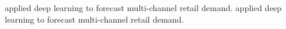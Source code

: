 \cite{punia_deep_2020} applied deep learning to forecast multi-channel retail demand. 
\citeauthor*{punia_deep_2020} applied deep learning to forecast multi-channel retail demand. 

